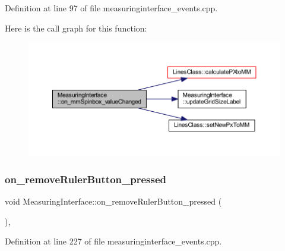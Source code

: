 Definition at line 97 of file measuringinterface\+\_\+events.\+cpp.

Here is the call graph for this function\+:
\nopagebreak
\begin{figure}[H]
\begin{center}
\leavevmode
\includegraphics[width=350pt]{class_measuring_interface_ac94cdc4a4e60d0910c499b5ed496790a_cgraph}
\end{center}
\end{figure}
\mbox{\label{class_measuring_interface_a23015fd17f84f8b656cbf4e352b02604}} 
\subsubsection{\texorpdfstring{on\_removeRulerButton\_pressed}{on\_removeRulerButton\_pressed}}
{\footnotesize\ttfamily void Measuring\+Interface\+::on\+\_\+remove\+Ruler\+Button\+\_\+pressed (\begin{DoxyParamCaption}{ }\end{DoxyParamCaption})\hspace{0.3cm}{\ttfamily [private]}, {\ttfamily [slot]}}



Definition at line 227 of file measuringinterface\+\_\+events.\+cpp.

